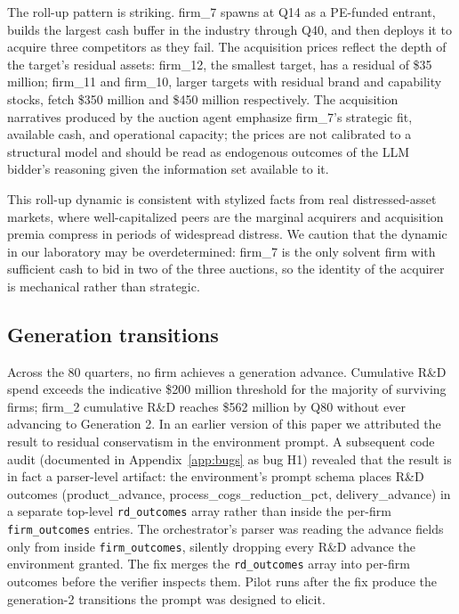 \documentclass[11pt]{article}
\begin{document}
The roll-up pattern is striking. firm\_7 spawns at Q14 as a PE-funded
entrant, builds the largest cash buffer in the industry through Q40, and
then deploys it to acquire three competitors as they fail. The
acquisition prices reflect the depth of the target's residual assets:
firm\_12, the smallest target, has a residual of \$35 million; firm\_11
and firm\_10, larger targets with residual brand and capability stocks,
fetch \$350 million and \$450 million respectively. The acquisition
narratives produced by the auction agent emphasize firm\_7's strategic
fit, available cash, and operational capacity; the prices are not
calibrated to a structural model and should be read as endogenous
outcomes of the LLM bidder's reasoning given the information set
available to it.

This roll-up dynamic is consistent with stylized facts from real
distressed-asset markets, where well-capitalized peers are the marginal
acquirers and acquisition premia compress in periods of widespread
distress. We caution that the dynamic in our laboratory may be
overdetermined: firm\_7 is the only solvent firm with sufficient cash
to bid in two of the three auctions, so the identity of the acquirer is
mechanical rather than strategic.

\subsection{Generation transitions}

Across the 80 quarters, no firm achieves a generation advance.
Cumulative R\&D spend exceeds the indicative \$200 million threshold for
the majority of surviving firms; firm\_2 cumulative R\&D reaches
\$562 million by Q80 without ever advancing to Generation 2. In an
earlier version of this paper we attributed the result to residual
conservatism in the environment prompt. A subsequent code audit
(documented in Appendix~\ref{app:bugs} as bug H1) revealed that the
result is in fact a parser-level artifact: the environment's prompt
schema places R\&D outcomes (product\_advance,
process\_cogs\_reduction\_pct, delivery\_advance) in a separate top-level
\texttt{rd\_outcomes} array rather than inside the per-firm
\texttt{firm\_outcomes} entries. The orchestrator's parser was reading
the advance fields only from inside \texttt{firm\_outcomes}, silently
dropping every R\&D advance the environment granted. The fix merges
the \texttt{rd\_outcomes} array into per-firm outcomes before the
verifier inspects them. Pilot runs after the fix produce the
generation-2 transitions the prompt was designed to elicit.
\end{document}

